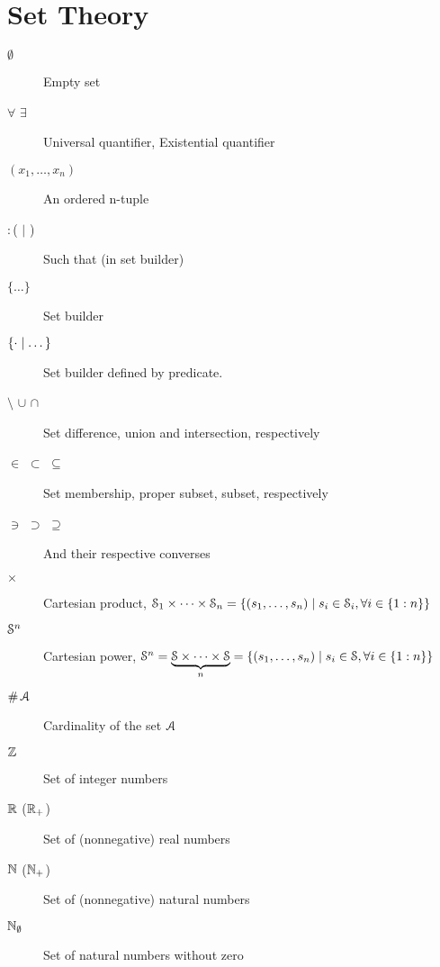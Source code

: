 \documentclass[../main.tex]{subfiles}
\begin{document}
\section*{Set Theory}
\begin{description}
  \item[$\emptyset$] Empty set
  \item[$\forall$ $\exists$] Universal quantifier, Existential quantifier
  \item[$(x_{1},\dots,x_{n})$] An ordered n-tuple
  \item[$:$\quad ( $\mid$ ) ] Such that (in set builder)
  \item[$\{\dots\}$] Set builder
  \item[$\{\cdot\mid\dots\}$] Set builder defined by predicate.
  \item[$\setminus$ $\cup$ $\cap$] Set difference, union and intersection, respectively
  \item[$\in$ $\subset$ $\subseteq$] Set membership, proper subset, subset, respectively
  \item[$\ni$ $\supset$ $\supseteq$] And their respective converses
  \item[$\times$] Cartesian product, $\mathcal{S}_{1}\times\dots\times\mathcal{S}_{n}=\{(s_{1},\dots,s_{n})\mid s_{i}\in\mathcal{S}_{i},\forall i\in\{1:n\}\}$
  \item[$\mathcal{S}^{n}$] Cartesian power, $\mathcal{S}^{n}=\underbrace{\mathcal{S}\times\dots\times\mathcal{S}}_{n}=\{(s_{1},\dots,s_{n})\mid s_{i}\in\mathcal{S},\forall i\in\{1:n\}\} $

  \item[$\operatorname{\#}{\mathcal{A}}$] Cardinality of the set $\mathcal{A}$
  \item[$\mathbb{Z}$] Set of integer numbers
  \item[$\mathbb{R}$ ($\mathbb{R}_{+}$)] Set of (nonnegative) real numbers
  \item[$\mathbb{N}$ ($\mathbb{N}_{+}$)] Set of (nonnegative) natural numbers
  \item[$\mathbb{N}_{\emptyset}$] Set of natural numbers without zero

\end{description}
\newpage
\end{document}

